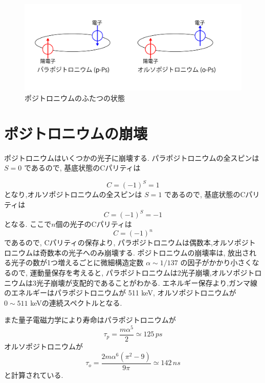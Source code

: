 \begin{figure}[H]
\centering
\includegraphics[keepaspectratio, scale=0.4]{fig/ybm/Ps.pdf}
\caption{ポジトロニウムのふたつの状態}
\label{fig:Ps}
\end{figure}


\section{ポジトロニウムの崩壊}

ポジトロニウムはいくつかの光子に崩壊する.
パラポジトロニウムの全スピンは $S=0$ であるので,
基底状態のCパリティは

\begin{equation}
	\nonumber
C = (-1)^{S} = 1
\end{equation}
となり,オルソポジトロニウムの全スピンは $S=1$ であるので,
基底状態のCパリティは
\begin{equation}
	\nonumber
C = (-1)^{S} = -1
\end{equation}
となる.
ここで$n$個の光子のCパリティは
\begin{equation}
	\nonumber
C = (-1)^{n}
\end{equation}
であるので,
Cパリティの保存より,
パラポジトロニウムは偶数本,オルソポジトロニウムは奇数本の光子へのみ崩壊する.
ポジトロニウムの崩壊率は,
放出される光子の数が1つ増えるごとに微細構造定数 $\alpha \sim 1/137$ の因子がかかり小さくなるので,
運動量保存を考えると,
パラポジトロニウムは2光子崩壊,オルソポジトロニウムは3光子崩壊が支配的であることがわかる.
エネルギー保存より,ガンマ線のエネルギーはパラポジトロニウムが 511 keV,
オルソポジトロニウムが $0 \sim 511$  keVの連続スペクトルとなる.

また量子電磁力学により寿命はパラポジトロニウムが
\begin{equation}
	\nonumber
\tau_{p} = \frac{m \alpha^{5}}{2} \simeq 125 \, \si{ps}
\end{equation}
オルソポジトロニウムが
\begin{equation}
	\nonumber
\tau_{o} = \frac{2m \alpha^{6}(\pi^{2}-9)}{9 \pi} \simeq 142 \, \si{ns}
\end{equation}
と計算されている.


